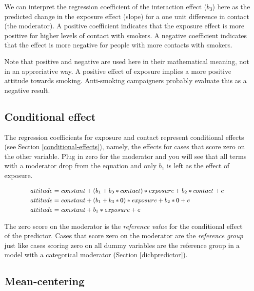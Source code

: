 \documentclass[a4paper]{book}
\theoremstyle{definition}
\theoremstyle{definition}
\theoremstyle{definition}
\theoremstyle{remark}
\begin{document}
We can interpret the regression coefficient of the interaction effect
(\(b_3\)) here as the predicted change in the exposure effect (slope)
for a one unit difference in contact (the moderator). A positive
coefficient indicates that the exposure effect is more positive for
higher levels of contact with smokers. A negative coefficient indicates
that the effect is more negative for people with more contacts with
smokers.

Note that positive and negative are used here in their mathematical
meaning, not in an appreciative way. A positive effect of exposure
implies a more positive attitude towards smoking. Anti-smoking
campaigners probably evaluate this as a negative result.

\subsection{Conditional effect}\label{conditional-effect-cont}

The regression coefficients for exposure and contact represent
conditional effects (see Section \ref{conditional-effects}), namely, the
effects for cases that score zero on the other variable. Plug in zero
for the moderator and you will see that all terms with a moderator drop
from the equation and only \(b_1\) is left as the effect of exposure.

\begin{equation}
\small
\begin{split}
  attitude = &\ constant + (b_1 + b_3*contact)*exposure + b_2*contact + e\\
  attitude = &\ constant + (b_1 + b_3*0)*exposure + b_2*0 + e\\
  attitude = &\ constant + b_1*exposure + e 
\end{split}
\label{eq:conditionaleffect} 
\normalsize
\end{equation}

The zero score on the moderator is the \emph{reference value} for the
conditional effect of the predictor. Cases that score zero on the
moderator are the \emph{reference group} just like cases scoring zero on
all dummy variables are the reference group in a model with a
categorical moderator (Section \ref{dichpredictor}).

\subsection{Mean-centering}\label{mean-centering}
\end{document}
